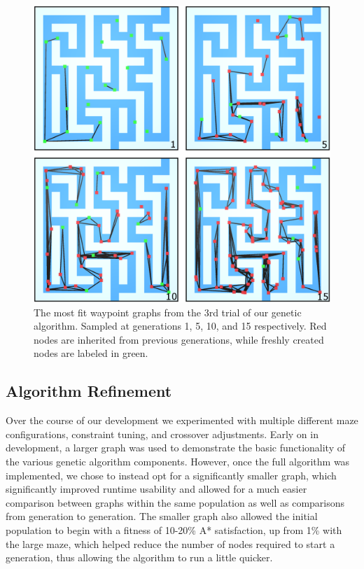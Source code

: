 	
	\begin{figure}
		\includegraphics[width=1\columnwidth]{tests/geneticT3b}
		\caption{The most fit waypoint graphs from the 3rd trial of our genetic algorithm. Sampled at generations 1, 5, 10, and 15 respectively. Red nodes are inherited from previous generations, while freshly created nodes are labeled in green.}
	\end{figure}
	
	
	\subsection{Algorithm Refinement}
	Over the course of our development we experimented with multiple different maze configurations, constraint tuning, and crossover adjustments. Early on in development, a larger graph was used to demonstrate the basic functionality of the various genetic algorithm components. However, once the full algorithm was implemented, we chose to instead opt for a significantly smaller graph, which significantly improved runtime usability and allowed for a much easier comparison between graphs within the same population as well as comparisons from generation to generation. The smaller graph also allowed the initial population to begin with a fitness of 10-20\% A* satisfaction, up from 1\% with the large maze, which helped reduce the number of nodes required to start a generation, thus allowing the algorithm to run a little quicker.
	
